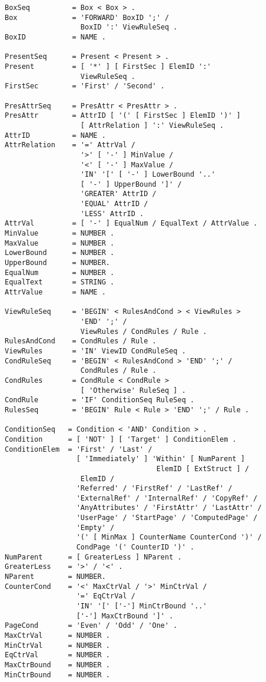 \begin{verbatim}
BoxSeq          = Box < Box > .
Box             = 'FORWARD' BoxID ';' /
                  BoxID ':' ViewRuleSeq .
BoxID           = NAME .

PresentSeq      = Present < Present > .
Present         = [ '*' ] [ FirstSec ] ElemID ':'
                  ViewRuleSeq .
FirstSec        = 'First' / 'Second' .

PresAttrSeq     = PresAttr < PresAttr > .
PresAttr        = AttrID [ '(' [ FirstSec ] ElemID ')' ] 
                  [ AttrRelation ] ':' ViewRuleSeq .
AttrID          = NAME .
AttrRelation    = '=' AttrVal /
                  '>' [ '-' ] MinValue /
                  '<' [ '-' ] MaxValue /
                  'IN' '[' [ '-' ] LowerBound '..' 
                  [ '-' ] UpperBound ']' /
                  'GREATER' AttrID /
                  'EQUAL' AttrID /
                  'LESS' AttrID .
AttrVal         = [ '-' ] EqualNum / EqualText / AttrValue .
MinValue        = NUMBER .
MaxValue        = NUMBER .
LowerBound      = NUMBER .
UpperBound      = NUMBER.
EqualNum        = NUMBER .
EqualText       = STRING .
AttrValue       = NAME .

ViewRuleSeq     = 'BEGIN' < RulesAndCond > < ViewRules >
                  'END' ';' /
                  ViewRules / CondRules / Rule .
RulesAndCond    = CondRules / Rule .
ViewRules       = 'IN' ViewID CondRuleSeq .
CondRuleSeq     = 'BEGIN' < RulesAndCond > 'END' ';' /
                  CondRules / Rule .
CondRules       = CondRule < CondRule >
                  [ 'Otherwise' RuleSeq ] .
CondRule        = 'IF' ConditionSeq RuleSeq .
RulesSeq        = 'BEGIN' Rule < Rule > 'END' ';' / Rule .

ConditionSeq   = Condition < 'AND' Condition > .
Condition      = [ 'NOT' ] [ 'Target' ] ConditionElem .
ConditionElem  = 'First' / 'Last' /
                 [ 'Immediately' ] 'Within' [ NumParent ]
                                    ElemID [ ExtStruct ] /
                  ElemID /
                 'Referred' / 'FirstRef' / 'LastRef' /
                 'ExternalRef' / 'InternalRef' / 'CopyRef' /
                 'AnyAttributes' / 'FirstAttr' / 'LastAttr' /
                 'UserPage' / 'StartPage' / 'ComputedPage' /
                 'Empty' /
                 '(' [ MinMax ] CounterName CounterCond ')' /
                 CondPage '(' CounterID ')' .
NumParent      = [ GreaterLess ] NParent .
GreaterLess    = '>' / '<' .
NParent        = NUMBER.
CounterCond    = '<' MaxCtrVal / '>' MinCtrVal /
                 '=' EqCtrVal / 
                 'IN' '[' ['-'] MinCtrBound '..' 
                 ['-'] MaxCtrBound ']' .
PageCond       = 'Even' / 'Odd' / 'One' .
MaxCtrVal      = NUMBER .
MinCtrVal      = NUMBER .
EqCtrVal       = NUMBER .
MaxCtrBound    = NUMBER .
MinCtrBound    = NUMBER .


\end{verbatim}
